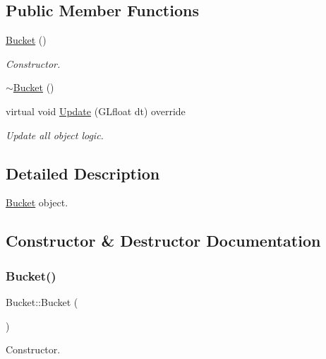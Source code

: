 \subsection*{Public Member Functions}
\begin{DoxyCompactItemize}
\item 
\mbox{\hyperlink{class_bucket_ab67ef01545c21ed49a252927f27b5d06}{Bucket}} ()
\begin{DoxyCompactList}\small\item\em Constructor. \end{DoxyCompactList}\item 
\mbox{\hyperlink{class_bucket_a7eabf4ad8a112fc588fc25d0a3492366}{$\sim$\+Bucket}} ()
\item 
virtual void \mbox{\hyperlink{class_bucket_a8e8e8e698b290cc92fc285c0177b1ae4}{Update}} (G\+Lfloat dt) override
\begin{DoxyCompactList}\small\item\em Update all object logic. \end{DoxyCompactList}\end{DoxyCompactItemize}


\subsection{Detailed Description}
\mbox{\hyperlink{class_bucket}{Bucket}} object. 

\subsection{Constructor \& Destructor Documentation}
\mbox{\label{class_bucket_ab67ef01545c21ed49a252927f27b5d06}} 
\subsubsection{\texorpdfstring{Bucket()}{Bucket()}}
{\footnotesize\ttfamily Bucket\+::\+Bucket (\begin{DoxyParamCaption}{ }\end{DoxyParamCaption})}



Constructor. 

\mbox{\label{class_bucket_a7eabf4ad8a112fc588fc25d0a3492366}} 
